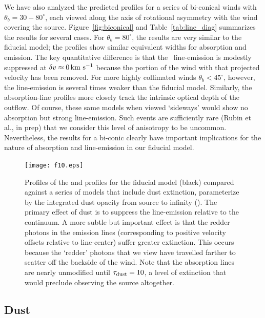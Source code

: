 \documentclass[]{emulateapj}
\begin{document}
We have also analyzed the predicted profiles for a series of bi-conical
winds with $\theta_b = 30-80^\circ$, each viewed along the axis of
rotational asymmetry with the wind covering the
source. Figure~\ref{fig:biconical} and
Table~\ref{tab:line_diag} summarizes the results for several cases.  For
$\theta_b = 80^\circ$, the results are
very similar to the fiducial model;  the profiles show
similar equivalent widths for absorption and emission.  The key
quantitative difference is that the \feiis\ line-emission is
modestly suppressed at $\delta v \approx 0 \, {\rm km~s^{-1}}$ because the portion of the
wind with that projected velocity has been removed.  For
more highly collimated winds
$\theta_b<45^\circ$, however, the
line-emission is several times weaker than the fiducial model.
Similarly, the absorption-line profiles more closely track the
intrinsic optical depth of the outflow.   Of course, these same models
when viewed `sideways' would show no absorption but strong
line-emission.  Such events are sufficiently rare (Rubin et
al., in prep) that we consider this level of anisotropy to be
uncommon.  Nevertheless, the results for a bi-conic clearly have
important implications for the nature of absorption and line-emission
in our fiducial model.

\begin{figure}
\texttt{[image: f10.eps]}
\caption{
Profiles of the  and  profiles for the fiducial
model (black) compared against a series of models that include 
dust extinction, parameterize by the integrated dust opacity from
source to infinity (\taud).  The primary effect of dust is to suppress 
the line-emission relative to the continuum. 
A more subtle but important effect is that the redder photons in the
emission lines (corresponding to positive velocity offsets relative to
line-center) suffer greater extinction.  
This occurs because the `redder' photons that we view have travelled 
farther to scatter off the backside of the wind.  Note that
the absorption lines are nearly unmodified until $\tau_{\rm dust} = 10$, a
level of extinction that would preclude observing the source
altogether.
}
\label{fig:dust}
\end{figure}


\subsection{Dust}
\label{sec:dust}
\end{document}
